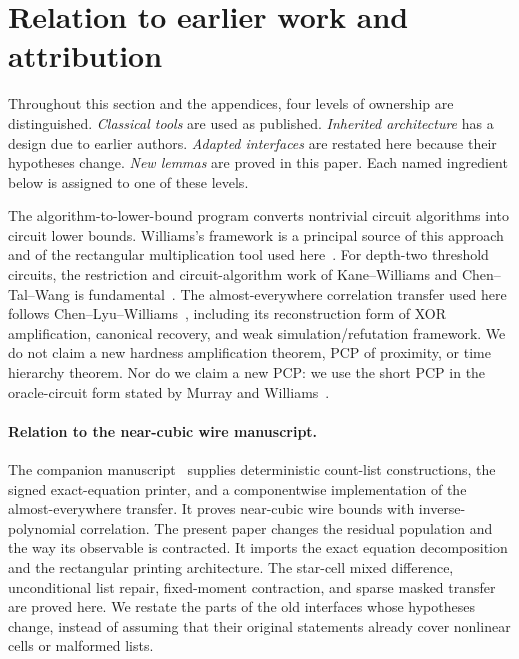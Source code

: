 \documentclass[11pt,letterpaper]{article}
\theoremstyle{definition}
\theoremstyle{remark}
\begin{document}
\section{Relation to earlier work and attribution}
\label{sec:related}

Throughout this section and the appendices, four levels of ownership
are distinguished. \emph{Classical tools} are used as published.
\emph{Inherited architecture} has a design due to earlier authors.
\emph{Adapted interfaces} are restated here because their hypotheses
change. \emph{New lemmas} are proved in this paper. Each named
ingredient below is assigned to one of these levels.

The algorithm-to-lower-bound program converts nontrivial circuit
algorithms into circuit lower bounds. Williams's framework is a principal
source of this approach and of the rectangular multiplication tool used
here~\cite{WilliamsRect}. For depth-two threshold circuits, the
restriction and circuit-algorithm work of Kane--Williams and
Chen--Tal--Wang is fundamental~\cite{KaneWilliams,CTW}. The
almost-everywhere correlation transfer used here follows
Chen--Lyu--Williams~\cite{CLW}, including its reconstruction form of XOR
amplification, canonical recovery, and weak simulation/refutation
framework. We do not claim a new hardness amplification theorem, PCP of
proximity, or time hierarchy theorem. Nor do we claim a new PCP: we
use the short PCP in the oracle-circuit form stated by Murray and
Williams~\cite[Section~5]{MW20}.

\paragraph{Relation to the near-cubic wire manuscript.}
The companion manuscript~\cite{NagCubic} supplies deterministic
count-list constructions, the signed exact-equation printer, and a
componentwise implementation of the almost-everywhere transfer. It proves
near-cubic wire bounds with inverse-polynomial correlation. The present
paper changes the residual population and the way its observable is
contracted. It imports the exact equation decomposition and the
rectangular printing architecture. The star-cell mixed difference,
unconditional list repair, fixed-moment contraction, and sparse masked
transfer are proved here. We restate the parts of the old interfaces
whose hypotheses change, instead of assuming that their original
statements already cover nonlinear cells or malformed lists.
\end{document}
